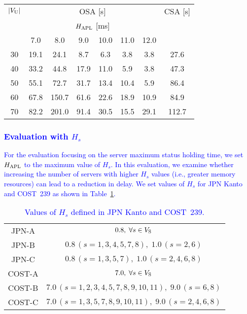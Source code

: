 \documentclass[10pt, letterpaper]{IEEEtran}
\newcommand\blue[1]{\textcolor{blue}{#1}}
\begin{document}
\begin{CJK}{UTF8}{ipxm}
\begin{table}[t]
  \begin{center}
    \begin{tabular}{c|cccccc|c}
      \hline
      $|V_{\rm{U}}|$ & \multicolumn{6}{c|}{OSA [s]} & CSA [s] \\ \cline{2-7}
       & \multicolumn{6}{c|}{$H_{\rm{APL}}$ [ms]} & \\
       & 7.0 & 8.0 & 9.0 & 10.0 & 11.0 & 12.0 &  \\
      \hline
      30 & 19.1 &  24.1 &  8.7 &  6.3 &  3.8 &  3.8 &  27.6 \\
      40 & 33.2 &  44.8 & 17.9 & 11.0 &  5.9 &  3.8 &  47.3 \\
      50 & 55.1 &  72.7 & 31.7 & 13.4 & 10.4 &  5.9 &  86.4 \\
      60 & 67.8 & 150.7 & 61.6 & 22.6 & 18.9 & 10.9 &  84.9 \\
      70 & 82.2 & 201.0 & 91.4 & 30.5 & 15.5 & 29.1 & 112.7 \\
      \hline
    \end{tabular}
  \end{center}
\end{table}

\subsubsection{\blue{Evaluation with $H_s$}}
\blue{
For the evaluation focusing on the server maximum status holding time, we set $H_{\rm APL}$ to the maximum value of $H_s$.
In this evaluation, we examine whether increasing the number of servers with higher $H_s$ values (i.e., greater memory resources) can lead to a reduction in delay.
We set values of $H_s$ for JPN Kanto and COST~239 as shown in Table~\ref{tab:condition_hs_JPN_COST}.
}
\begin{table}[t]
  \caption{\blue{Values of $H_s$ defined in JPN Kanto and COST~239.}}
  \label{tab:condition_hs_JPN_COST}
  \begin{center}
    \begin{tabular}{c|c}
      \hline
      JPN-A & $0.8,\; \forall s \in V_{\rm S}$ \\
      JPN-B & $0.8\,(s=1,3,4,5,7,8),\;1.0\,(s=2,6)$ \\
      JPN-C & $0.8\,(s=1,3,5,7),\;1.0\,(s=2,4,6,8)$ \\
      \hline
      COST-A & $7.0,\; \forall s \in V_{\rm S}$ \\
      COST-B & $7.0\,(s=1,2,3,4,5,7,8,9,10,11),\;9.0\,(s=6,8)$ \\
      COST-C & $7.0\,(s=1,3,5,7,8,9,10,11),\;9.0\,(s=2,4,6,8)$ \\
      \hline
    \end{tabular}
  \end{center}
\end{table}


\end{CJK}
\end{document}

